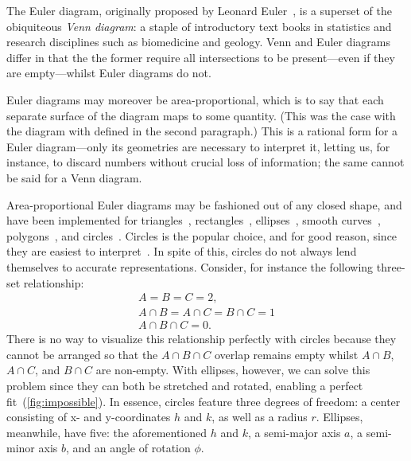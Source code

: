 \documentclass[
  oneside,
  openany,
  numbers=noendperiod,
  parskip=half,
  bibliography=totoc
]{scrbook}\usepackage[]{graphicx}\usepackage{xcolor}
\begin{document}
The Euler diagram, originally proposed by Leonard Euler~\citep{euler_1802}, is
a superset of the obiquiteous \emph{Venn diagram}: a staple of introductory
text books in statistics and research disciplines such as biomedicine and
geology. Venn and Euler diagrams differ in that the the former require all
intersections to be present---even if they are empty---whilst Euler diagrams do
not.

Euler diagrams may moreover be area-proportional, which is to say that each separate
surface of the diagram maps to some quantity. (This was the case with
the diagram with defined in the second paragraph.) This is a rational form for a
Euler diagram---only its geometries are necessary to interpret it, letting us, for
instance, to discard numbers without crucial loss of information; the same
cannot be said for a Venn diagram.

Area-proportional Euler diagrams may be fashioned out of any closed shape, and
have been implemented for triangles~\citep{swinton_2011},
rectangles~\citep{swinton_2011}, ellipses~\citep{micallef_2014}, smooth
curves~\citep{micallef_2014b}, polygons~\citep{swinton_2011}, and
circles~\citep{wilkinson_2012,kestler_2008,swinton_2011}. Circles is the
popular choice, and for good reason, since they are easiest to
interpret~\citep{blake_2016}. In spite of this, circles do not always lend
themselves to accurate representations. Consider, for instance the following
three-set relationship:
\[
\begin{gathered}
A = B = C = 2,\\
A \cap B = A \cap C = B \cap C = 1\\
A \cap B \cap C = 0.
\end{gathered}
\]
There is no way to visualize this relationship perfectly with circles because
they cannot be arranged so that the $A \cap B \cap C$ overlap remains empty whilst
$A \cap B$, $A \cap C$, and $B \cap C$ are non-empty. With ellipses, however,
we can solve this problem since they can both be stretched and rotated, enabling
a perfect fit~(\cref{fig:impossible}). In essence, circles
feature three degrees of freedom: a center consisting of x- and
y-coordinates $h$ and $k$, as well as a radius $r$. Ellipses, meanwhile, have
five: the aforementioned $h$ and $k$, a semi-major axis $a$, a semi-minor axis
$b$, and an angle of rotation $\phi$.
\end{document}
